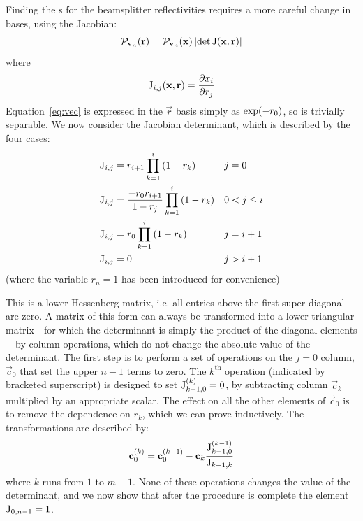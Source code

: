 Finding the \pdf{}s for the beamsplitter reflectivities requires a more careful
change in bases, using the Jacobian:
\begin{equation}
  \mathcal{P}_{\mathbf{v}_n} \!\left(\mathbf{r}\right) = \mathcal{P}_{\mathbf{v}_n} \!\left(\mathbf{x}\right)
  \left|\det \mathrm{J} \!\left(\mathbf{x}, \mathbf{r}\right)\right|
\end{equation}
where
\begin{equation}
  \mathrm{J}_{i,j} \!\left(\mathbf{x}, \mathbf{r}\right) = \frac{\partial x_{i}}{\partial r_j}
\end{equation}
Equation~\ref{eq:vec} is expressed in the \(\vec{r}\) basis simply as \(\exp
\!\left(-r_0\right)\), so is trivially separable. We now consider the Jacobian
determinant, which is described by the four cases:
\begin{align}
  \label{eq:firstcolumn}
  \mathrm{J}_{i,j} &= r_{i+1} \prod_{k=1}^{i} \left( 1-r_k \right) && j=0 \\
  \mathrm{J}_{i,j} &= \frac{-r_0 r_{i+1}}{1-r_{j}} \prod_{k=1}^{i} \left( 1-r_k
    \right) && 0< j \leq i\\
  \label{eq:diagonal}
  \mathrm{J}_{i,j} &= r_0 \prod_{k=1}^{i} \left( 1-r_k \right) && j = i+1 \\
  \mathrm{J}_{i,j} &= 0 && j>i+1
\end{align}
(where the variable \(r_{n}=1\) has been introduced for convenience)

This is a lower Hessenberg matrix, i.e. all entries above the first
super-diagonal are zero. A matrix of this form can always be transformed into a
lower triangular matrix---for which the determinant is simply the product of the
diagonal elements---by column operations, which do not change the absolute value
of the determinant. The first step is to perform a set of operations on the
\(j=0\) column, \(\vec{c}_{0}\) that set the upper \(n-1\) terms to zero.
The \(k^{\text{th}}\) operation (indicated by bracketed superscript) is designed
to set \(\mathrm{J}_{k-1,0}^{\left( k \right)}=0\), by subtracting column
\(\vec{c}_{k}\) multiplied by an appropriate scalar. The effect on all
the other elements of \(\vec{c}_{0}\) is to remove the dependence on \(r_{k}\),
which we can prove inductively. The transformations are described by:
\begin{equation}
  \label{eq:columns}
  \mathbf{c}_{0}^{\left( k \right)} = \mathbf{c}_{0}^{\left( k-1 \right)} -
  \mathbf{c}_{k} \frac{\mathrm{J}_{k-1,0}^{\left( k-1 \right)}}{\mathrm{J}_{k-1,k}}
\end{equation}
where \(k\) runs from \(1\) to \(m-1\). None of these operations changes the
value of the determinant, and we now show that after the procedure is complete
the element \(\mathrm{J}_{0,n-1}=1\).

